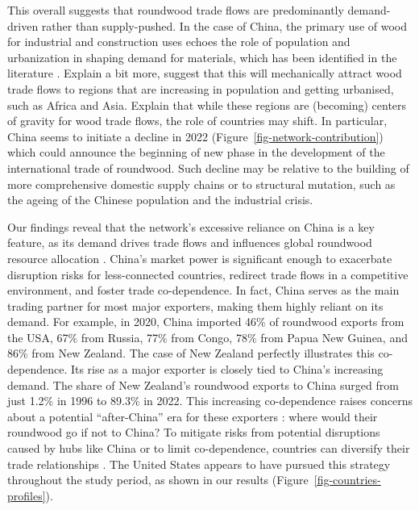 \documentclass[
  authoryear,
  review,
  3p]{elsarticle}
\begin{document}
This overall suggests that roundwood trade flows are predominantly
demand-driven rather than supply-pushed. In the case of China, the
primary use of wood for industrial and construction uses
\citep{hou_intensifying_2019} echoes the role of population and
urbanization in shaping demand for materials, which has been identified
in the literature
\citep{unecefao_forest_2022-1, mathieu_meta-analysis_2023, villamor_preparing_2024}.
Explain a bit more, suggest that this will mechanically attract wood
trade flows to regions that are increasing in population and getting
urbanised, such as Africa and Asia. Explain that while these regions are
(becoming) centers of gravity for wood trade flows, the role of
countries may shift. In particular, China seems to initiate a decline in
2022 (Figure~\ref{fig-network-contribution}) which could announce the
beginning of new phase in the development of the international trade of
roundwood. Such decline may be relative to the building of more
comprehensive domestic supply chains or to structural mutation, such as
the ageing of the Chinese population and the industrial crisis.

Our findings reveal that the network's excessive reliance on China is a
key feature, as its demand drives trade flows and influences global
roundwood resource allocation \citep{huang_static_2024}. China's market
power is significant enough to exacerbate disruption risks for
less-connected countries, redirect trade flows in a competitive
environment, and foster trade co-dependence. In fact, China serves as
the main trading partner for most major exporters, making them highly
reliant on its demand. For example, in 2020, China imported 46\% of
roundwood exports from the USA, 67\% from Russia, 77\% from Congo, 78\%
from Papua New Guinea, and 86\% from New Zealand. The case of New
Zealand perfectly illustrates this co-dependence. Its rise as a major
exporter is closely tied to China's increasing demand. The share of New
Zealand's roundwood exports to China surged from just 1.2\% in 1996 to
89.3\% in 2022. This increasing co-dependence raises concerns about a
potential ``after-China'' era for these exporters
\citep{villamor_preparing_2024}: where would their roundwood go if not
to China? To mitigate risks from potential disruptions caused by hubs
like China or to limit co-dependence, countries can diversify their
trade relationships \citep{huang_static_2024}. The United States appears
to have pursued this strategy throughout the study period, as shown in
our results (Figure~\ref{fig-countries-profiles}).
\end{document}
